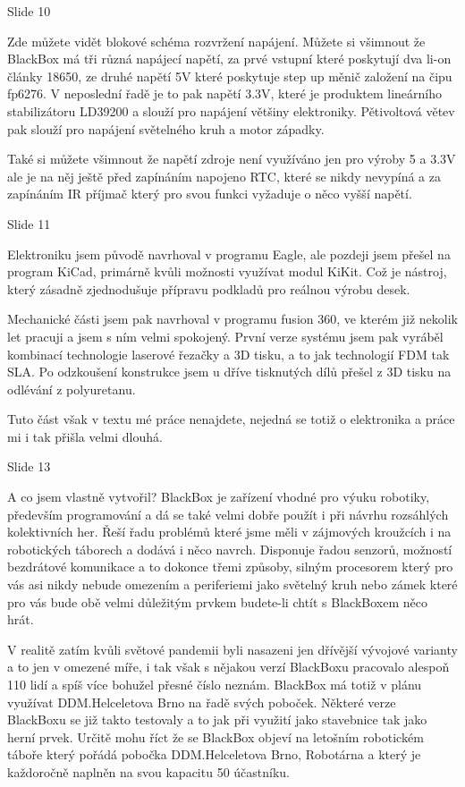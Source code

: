 Slide 10

Zde můžete vidět blokové schéma rozvržení napájení.
Můžete si všimnout že BlackBox má tři různá napájecí napětí, za prvé vstupní které poskytují dva li-on články 18650, 
ze druhé napětí 5V které poskytuje step up měnič založení na čipu fp6276. V neposlední řadě je to pak napětí 3.3V,
které je produktem lineárního stabilizátoru LD39200 a slouží pro napájení většiny elektroniky.
Pětivoltová větev pak slouží pro napájení světelného kruh a motor západky.

Také si můžete všimnout že napětí zdroje není využíváno jen pro výroby 5 a 3.3V ale je na něj ještě před zapínáním 
napojeno RTC, které se nikdy nevypíná a za zapínáním IR příjmač který pro svou funkci vyžaduje o něco vyšší napětí.


Slide 11

Elektroniku jsem původě navrhoval v programu Eagle, ale pozdeji jsem přešel na program KiCad, primárně kvůli možnosti
využívat modul KiKit. Což je nástroj, který zásadně zjednodušuje přípravu podkladů pro reálnou výrobu desek. 

Mechanické části jsem pak navrhoval v programu fusion 360, ve kterém již nekolik let pracuji a jsem s ním velmi spokojený.
První verze systému jsem pak vyráběl kombinací technologie laserové řezačky a 3D tisku, a to jak technologií FDM tak SLA.
Po odzkoušení konstrukce jsem u dříve tisknutých dílů přešel z 3D tisku na odlévání z polyuretanu. 

Tuto část však v textu mé práce nenajdete, nejedná se totiž o elektronika a práce mi i tak přišla velmi dlouhá.


Slide 13

A co jsem vlastně vytvořil? 
BlackBox je zařízení vhodné pro výuku robotiky, především programování a dá se také velmi dobře použít i při návrhu rozsáhlých 
kolektivních her. Řeší řadu problémů které jsme měli v zájmových kroužcích i na robotických táborech a dodává i něco navrch.
Disponuje řadou senzorů, možností bezdrátové komunikace a to dokonce třemi způsoby, silným procesorem který pro vás asi nikdy nebude omezením
a periferiemi jako světelný kruh nebo zámek které pro vás bude obě velmi důležitým prvkem budete-li chtít s BlackBoxem něco hrát.

V realitě zatím kvůli světové pandemii byli nasazeni jen dřívější vývojové varianty a to jen v omezené míře, i tak však s nějakou verzí BlackBoxu 
pracovalo alespoň 110 lidí a spíš více bohužel přesné číslo neznám. BlackBox má totiž v plánu využívat DDM.Helceletova Brno na řadě svých poboček.
Některé verze BlackBoxu se již takto testovaly a to jak při využití jako stavebnice tak jako herní prvek. Určitě mohu říct že se BlackBox objeví 
na letošním robotickém táboře který pořádá pobočka DDM.Helceletova Brno, Robotárna a který je každoročně naplněn na svou kapacitu 50 účastníku. %

